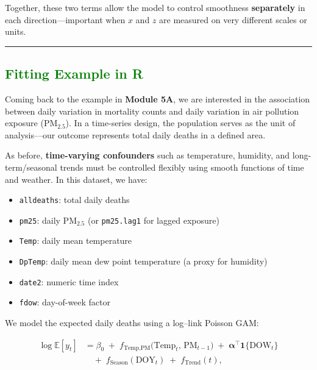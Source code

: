 \documentclass[
  letterpaper,
  DIV=11,
  numbers=noendperiod]{scrreprt}
\providecommand{\tightlist}{%
  \setlength{\itemsep}{0pt}\setlength{\parskip}{0pt}}\usepackage{longtable,booktabs,array}
\begin{document}
Together, these two terms allow the model to control smoothness
\textbf{separately} in each direction---important when \(x\) and \(z\)
are measured on very different scales or units.

\begin{center}\rule{0.5\linewidth}{0.5pt}\end{center}

\hypertarget{section-34}{%
\subsection*{\texorpdfstring{\textcolor{green}{Fitting Example in R}}{}}\label{section-34}}

Coming back to the example in \textbf{Module 5A}, we are interested in
the association between daily variation in mortality counts and daily
variation in air pollution exposure (PM\(_{2.5}\)). In a time-series
design, the population serves as the unit of analysis---our outcome
represents total daily deaths in a defined area.

As before, \textbf{time-varying confounders} such as temperature,
humidity, and long-term/seasonal trends must be controlled flexibly
using smooth functions of time and weather. In this dataset, we have:

\begin{itemize}
\tightlist
\item
  \texttt{alldeaths}: total daily deaths\\
\item
  \texttt{pm25}: daily PM\(_{2.5}\) (or \texttt{pm25.lag1} for lagged
  exposure)\\
\item
  \texttt{Temp}: daily mean temperature\\
\item
  \texttt{DpTemp}: daily mean dew point temperature (a proxy for
  humidity)\\
\item
  \texttt{date2}: numeric time index\\
\item
  \texttt{fdow}: day-of-week factor
\end{itemize}

We model the expected daily deaths using a log--link Poisson GAM:

\[
\begin{aligned}
\log \mathbb{E}[y_t]
&= \beta_0
\;+\; f_{\text{Temp,PM}}\!\big(\text{Temp}_t,\, \text{PM}_{t-1}\big)
\;+\; \boldsymbol{\alpha}^\top \mathbf{1}\{\text{DOW}_t\} \\[4pt]
&\quad+\; f_{\text{Season}}(\text{DOY}_t)
\;+\; f_{\text{Trend}}(t),
\end{aligned}
\]
\end{document}
